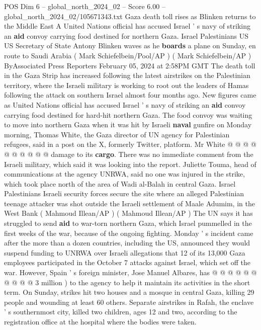 \begin{textsample}{POS Dim 6 – global\_north\_2024\_02 – Score 6.00 – global\_north\_2024\_02/105671343.txt}  \label{ex:f6_pos_200}
Gaza death toll rises as Blinken returns to the Middle East A United Nations official has accused Israel ' s navy of striking an \textbf{aid} convoy carrying food destined for northern Gaza.
Israel Palestinians US US Secretary of State Antony Blinken waves as he \textbf{boards} a plane on Sunday, en route to Saudi Arabia ( Mark Schiefelbein/Pool/AP ) ( Mark Schiefelbein/AP ) ByAssociated Press Reporters February 05, 2024 at 2:58PM GMT The death toll in the Gaza Strip has increased following the latest airstrikes on the Palestinian territory, where the Israeli military is working to root out the leaders of Hamas following the attack on southern Israel almost four months ago.
New figures came as United Nations official has accused Israel ' s navy of striking an \textbf{aid} convoy carrying food destined for hard-hit northern Gaza.
The food convoy was waiting to move into northern Gaza when it was hit by Israeli \textbf{naval} gunfire on Monday morning, Thomas White, the Gaza director of UN agency for Palestinian refugees, said in a post on the X, formerly Twitter, platform.
Mr White @ @ @ @ @ @ @ @ @ @ damage to its \textbf{cargo}.
There was no immediate comment from the Israeli military, which said it was looking into the report.
Juliette Touma, head of communications at the agency UNRWA, said no one was injured in the strike, which took place north of the area of Wadi al-Balah in central Gaza.
Israel Palestinians Israeli security forces secure the site where an alleged Palestinian teenage attacker was shot outside the Israeli settlement of Maale Adumim, in the West Bank ( Mahmoud Illean/AP ) ( Mahmoud Illean/AP ) The UN says it has struggled to send \textbf{aid} to war-torn northern Gaza, which Israel pummelled in the first weeks of the war, because of the ongoing fighting.
Monday ' s incident came after the more than a dozen countries, including the US, announced they would suspend funding to UNRWA over Israeli allegations that 12 of its 13,000 Gaza employees participated in the October 7 attacks against Israel, which set off the war.
However, Spain ' s foreign minister, Jose Manuel Albares, has @ @ @ @ @ @ @ @ @ @ 3 million ) to the agency to help it maintain its activities in the short term.
On Sunday, strikes hit two houses and a mosque in central Gaza, killing 29 people and wounding at least 60 others.
Separate airstrikes in Rafah, the enclave ' s southernmost city, killed two children, ages 12 and two, according to the registration office at the hospital where the bodies were taken.

\end{textsample}
